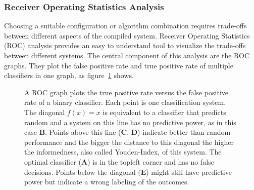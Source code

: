 \subsubsection{Receiver Operating Statistics Analysis}

Choosing a suitable configuration or algorithm combination requires trade-offs between different aspects of the compiled system.
Receiver Operating Statistics (ROC) analysis\cite{fawcett_2006} provides an easy to understand tool to visualize the trade-offs between different systems.
The central component of this analysis are the ROC graphs.
They plot the false positive rate and true positive rate of multiple classifiers in one graph, as figure~\ref{fig:roc_graph} shows.
\begin{figure}[H]
\caption[The elements of a ROC graph]{A ROC graph plots the true positive rate versus the false positive rate of a binary classifier. Each point is one classification system. The diagonal $f(x) = x$ is equivalent to a classifier that predicts random and a system on this line has no predictive power, as in this case $\mathbf{B}$. Points above this line ($\mathbf{C}$, $\mathbf{D}$) indicate better-than-random performance and the bigger the distance to this diagonal the higher the informedness, also called Youden-Index, of this system. The optimal classifier ($\mathbf{A}$) is in the topleft corner and has no false decisions. Points below the diagonal ($\mathbf{E}$) might still have predictive power but indicate a wrong labeling of the outcomes.}\label{fig:roc_graph}
\end{figure}

